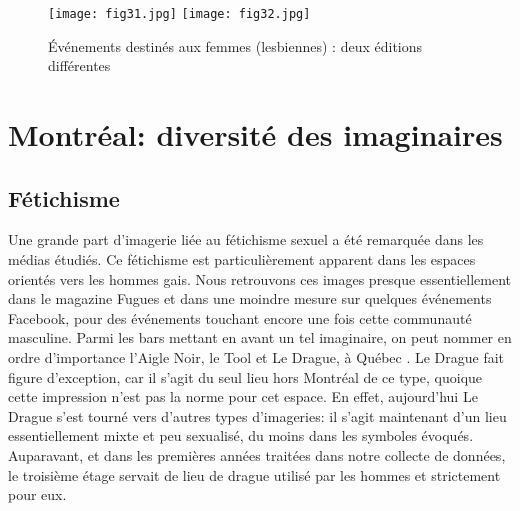 \begin{figure}
\centering
{}
{\texttt{[image: fig31.jpg]}}
{\texttt{[image: fig32.jpg]}}
\caption{Événements destinés aux femmes (lesbiennes) : deux éditions
  différentes}\label{figs3132}
\end{figure}

\section{Montréal: diversité des imaginaires}
\label{sec:montr_al_diversit_des_imaginaires}

\subsection{Fétichisme}
Une grande part d'imagerie liée au fétichisme sexuel a été remarquée dans les médias étudiés. 
Ce fétichisme est particulièrement apparent dans les espaces orientés vers les hommes gais. 
Nous retrouvons ces images presque essentiellement dans le magazine Fugues et dans une moindre mesure sur quelques événements Facebook, pour des événements touchant encore une fois cette communauté masculine. 
Parmi les bars mettant en avant un tel imaginaire, on peut nommer en ordre d'importance l'Aigle Noir, le Tool et Le Drague, à Québec . 
Le Drague fait figure d'exception, car il s'agit du seul lieu hors Montréal de ce type, quoique cette impression n'est pas la norme pour cet espace. 
En effet, aujourd'hui Le Drague s'est tourné vers d'autres types d'imageries: il s'agit maintenant d'un lieu essentiellement mixte et peu sexualisé, du moins dans les symboles évoqués. 
Auparavant, et dans les premières années traitées dans notre collecte de données, le troisième étage servait de lieu de drague utilisé par les hommes et strictement pour eux. 

